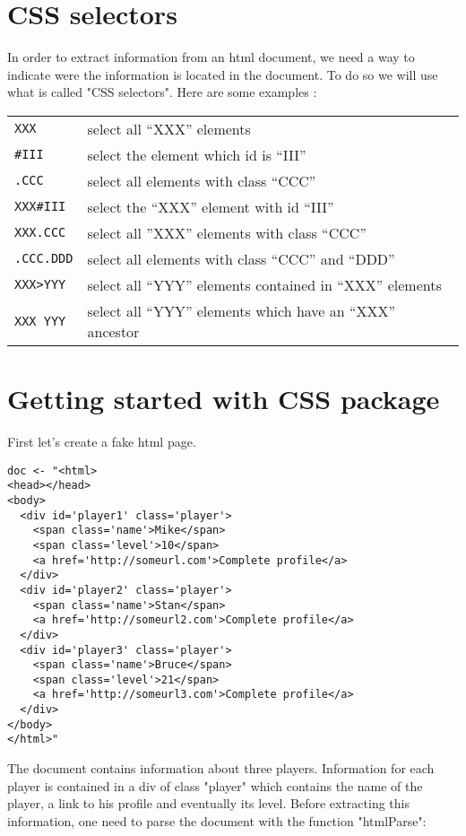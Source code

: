 \documentclass{article}
\begin{document}
\section*{CSS selectors}

In order to extract information from an html document, we need a way to indicate were the information is located in the document. To do so we will use what is called "CSS selectors". Here are some examples :\\

\begin{tabular}{ll}
\texttt{XXX} & select all ``XXX'' elements\tabularnewline
\noalign{\vskip\doublerulesep}
\texttt{\#III} & select the element which id is ``III''\tabularnewline
\noalign{\vskip\doublerulesep}
\texttt{.CCC} & select all elements with class ``CCC''\tabularnewline
\noalign{\vskip\doublerulesep}
\texttt{XXX\#III} & select the ``XXX'' element with id ``III''\tabularnewline
\noalign{\vskip\doublerulesep}
\texttt{XXX.CCC} & select all ''XXX'' elements with class ``CCC''\tabularnewline
\noalign{\vskip\doublerulesep}
\texttt{.CCC.DDD} & select all elements with class ``CCC'' and ``DDD''\tabularnewline
\noalign{\vskip\doublerulesep}
\texttt{XXX>YYY} & select all ``YYY'' elements contained in ``XXX'' elements\tabularnewline
\noalign{\vskip\doublerulesep}
\texttt{XXX YYY} & select all ``YYY'' elements which have an ``XXX'' ancestor\tabularnewline
\end{tabular}




\section*{Getting started with CSS package}

First let's create a fake html page. 


\begin{verbatim}
doc <- "<html>
<head></head>
<body>
  <div id='player1' class='player'>
    <span class='name'>Mike</span>
    <span class='level'>10</span>
    <a href='http://someurl.com'>Complete profile</a>
  </div>
  <div id='player2' class='player'>
    <span class='name'>Stan</span>
    <a href='http://someurl2.com'>Complete profile</a>
  </div>
  <div id='player3' class='player'>
    <span class='name'>Bruce</span>
    <span class='level'>21</span>
    <a href='http://someurl3.com'>Complete profile</a>
  </div>
</body>
</html>"
\end{verbatim}

The document contains information about three players. Information for each player is contained in a div of class "player" which contains the name of the player, a link to his profile and eventually its level. Before extracting this information, one need to parse the document with the function "htmlParse":
\end{document}
